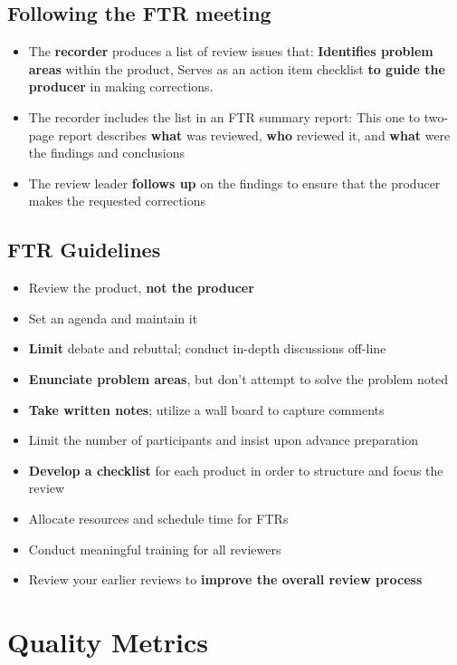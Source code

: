 \documentclass{article}
\begin{document}
\subsection{Following the FTR meeting}

\begin{itemize}
  \item The \textbf{recorder} produces a list of review issues that: \textbf{Identifies problem areas} within the product, Serves as an action item checklist \textbf{to guide the producer} in making corrections.
  \item The recorder includes the list in an FTR summary report: This one to two-page report describes \textbf{what} was reviewed, \textbf{who} reviewed it, and \textbf{what} were the findings and conclusions
  \item The review leader \textbf{follows up} on the findings to ensure that the producer makes the requested corrections
\end{itemize}

\subsection{FTR Guidelines}

\begin{itemize}
  \item Review the product, \textbf{not the producer}
  \item Set an agenda and maintain it
  \item \textbf{Limit} debate and rebuttal; conduct in-depth discussions off-line
  \item \textbf{Enunciate problem areas}, but don't attempt to solve the problem noted
  \item \textbf{Take written notes}; utilize a wall board to capture comments
  \item Limit the number of participants and insist upon advance preparation
  \item \textbf{Develop a checklist} for each product in order to structure and focus the review
  \item Allocate resources and schedule time for FTRs
  \item Conduct meaningful training for all reviewers
  \item Review your earlier reviews to \textbf{improve the overall review process}
\end{itemize}

\section{Quality Metrics}
\end{document}

